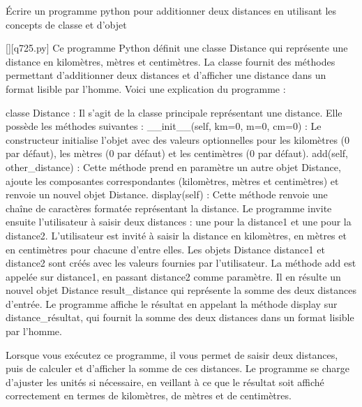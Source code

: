        \question
        Écrire un programme python pour additionner deux distances en utilisant les concepts de classe et d'objet
        \par
        \begin{solution}
            \renewcommand{\nomfichier}{q725.py}
            \pythonfile{\chemincode \nomfichier}[][\nomfichier]
            Ce programme Python définit une classe Distance qui représente une distance en kilomètres, mètres et centimètres. La classe fournit des méthodes permettant d'additionner deux distances et d'afficher une distance dans un format lisible par l'homme. Voici une explication du programme :

    classe Distance : Il s'agit de la classe principale représentant une distance. Elle possède les méthodes suivantes :
        __init__(self, km=0, m=0, cm=0) : Le constructeur initialise l'objet avec des valeurs optionnelles pour les kilomètres (0 par défaut), les mètres (0 par défaut) et les centimètres (0 par défaut).
        add(self, other_distance) : Cette méthode prend en paramètre un autre objet Distance, ajoute les composantes correspondantes (kilomètres, mètres et centimètres) et renvoie un nouvel objet Distance.
        display(self) : Cette méthode renvoie une chaîne de caractères formatée représentant la distance.
    Le programme invite ensuite l'utilisateur à saisir deux distances : une pour la distance1 et une pour la distance2. L'utilisateur est invité à saisir la distance en kilomètres, en mètres et en centimètres pour chacune d'entre elles.
    Les objets Distance distance1 et distance2 sont créés avec les valeurs fournies par l'utilisateur.
    La méthode add est appelée sur distance1, en passant distance2 comme paramètre. Il en résulte un nouvel objet Distance result_distance qui représente la somme des deux distances d'entrée.
    Le programme affiche le résultat en appelant la méthode display sur distance_résultat, qui fournit la somme des deux distances dans un format lisible par l'homme.

Lorsque vous exécutez ce programme, il vous permet de saisir deux distances, puis de calculer et d'afficher la somme de ces distances. Le programme se charge d'ajuster les unités si nécessaire, en veillant à ce que le résultat soit affiché correctement en termes de kilomètres, de mètres et de centimètres.
        \end{solution}
        


